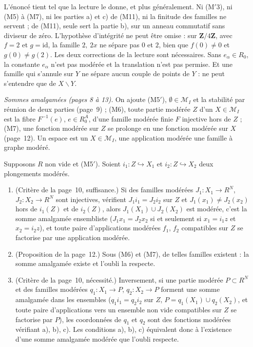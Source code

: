 \begin{remarque}
L'énoncé tient tel que la lecture le donne, et plus généralement. Ni (M$'$3), ni (M5) à (M7), ni les parties a) et c) de (M11), ni la finitude des familles ne servent ; de (M11), seule sert la partie b), sur un anneau commutatif sans diviseur de zéro. L'hypothèse d'intégrité ne peut être omise : sur $\mathbf Z/4\mathbf Z$, avec $f = 2$ et $g = \mathrm{id}$, la famille $2,\ 2x$ ne sépare pas $0$ et $2$, bien que $f(0) \neq 0$ et $g(0) \neq g(2)$. Les deux corrections de la lecture sont nécessaires. Sans $e_\alpha \in R_0$, la constante $e_\alpha$ n'est pas modérée et la translation n'est pas permise. Et une famille qui s'annule sur $Y$ ne sépare aucun couple de points de $Y$ :  ne peut s'entendre que de $X \smallsetminus Y$.
\end{remarque}

\noindent\emph{Sommes amalgamées (pages 8 à 13).} On ajoute (M5$'$), $\emptyset \in \mathcal M_I$ et la stabilité par réunion de deux parties (page~9) ; (M6), toute partie modérée $Z$ d'un $X \in \mathcal M_I$ est la fibre $F^{-1}(e)$, $e \in R_0^A$, d'une famille modérée finie $F$ injective hors de $Z$ ; (M7), une fonction modérée sur $Z$ se prolonge en une fonction modérée sur $X$ (page~12). Un espace est un $X \in \mathcal M_I$, une application modérée une famille à graphe modéré.

\begin{encadre}
\begin{theoreme}
Supposons $R$ non vide et (M5$'$). Soient $i_1 : Z \hookrightarrow X_1$ et $i_2 : Z \hookrightarrow X_2$ deux plongements modérés.
\begin{enumerate}
\item (Critère de la page~10, suffisance.) Si des familles modérées $J_1 : X_1 \to R^N$, $J_2 : X_2 \to R^N$ sont injectives, vérifient $J_1 i_1 = J_2 i_2$ sur $Z$ et $J_1(x_1) \neq J_2(x_2)$ hors de $i_1(Z)$ et de $i_2(Z)$, alors $J_1(X_1) \cup J_2(X_2)$ est modérée, c'est la somme amalgamée ensembliste ($J_1 x_1 = J_2 x_2$ si et seulement si $x_1 = i_1 z$ et $x_2 = i_2 z$), et toute paire d'applications modérées $f_1$, $f_2$ compatibles sur $Z$ se factorise par une application modérée.
\item (Proposition de la page~12.) Sous (M6) et (M7), de telles familles existent : la somme amalgamée existe et l'oubli la respecte.
\item (Critère de la page~10, nécessité.) Inversement, si une partie modérée $P \subset R^N$ et des familles modérées $q_1 : X_1 \to P$, $q_2 : X_2 \to P$ forment une somme amalgamée dans les ensembles ($q_1 i_1 = q_2 i_2$ sur $Z$, $P = q_1(X_1) \cup q_2(X_2)$, et toute paire d'applications vers un ensemble non vide compatibles sur $Z$ se factorise par $P$), les coordonnées de $q_1$ et $q_2$ sont des fonctions modérées vérifiant a), b), c). Les conditions a), b), c) équivalent donc à l'existence d'une somme amalgamée modérée que l'oubli respecte.
\end{enumerate}
\end{theoreme}
\end{encadre}

